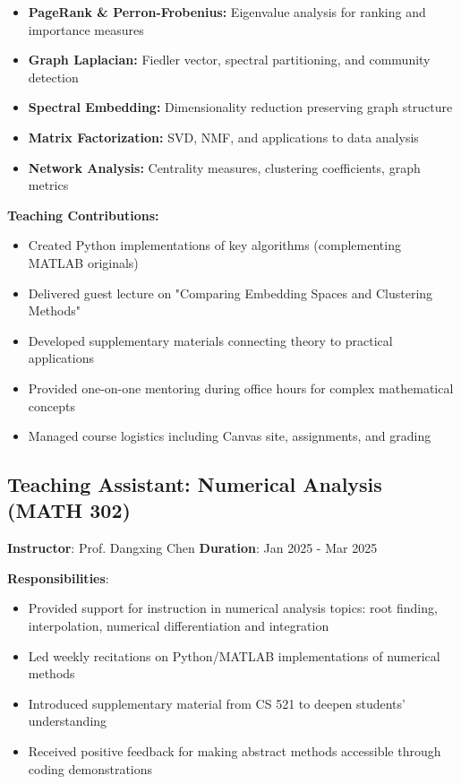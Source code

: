 \begin{itemize}[leftmargin=1.2em, itemsep=0.1em]
  \item \textbf{PageRank \& Perron-Frobenius:} Eigenvalue analysis for ranking and importance measures
  \item \textbf{Graph Laplacian:} Fiedler vector, spectral partitioning, and community detection
  \item \textbf{Spectral Embedding:} Dimensionality reduction preserving graph structure
  \item \textbf{Matrix Factorization:} SVD, NMF, and applications to data analysis
  \item \textbf{Network Analysis:} Centrality measures, clustering coefficients, graph metrics
\end{itemize}

\textbf{Teaching Contributions:}

\begin{itemize}[leftmargin=1.2em, itemsep=0.1em]
  \item Created Python implementations of key algorithms (complementing MATLAB originals)
  \item Delivered guest lecture on "Comparing Embedding Spaces and Clustering Methods"
  \item Developed supplementary materials connecting theory to practical applications
  \item Provided one-on-one mentoring during office hours for complex mathematical concepts
  \item Managed course logistics including Canvas site, assignments, and grading
\end{itemize}

\vspace{1em}


\subsection*{Teaching Assistant: Numerical Analysis (MATH 302)}

\textbf{Instructor}: Prof. Dangxing Chen \quad \textbf{Duration}: Jan 2025 - Mar 2025

\textbf{Responsibilities}:
\begin{itemize}[leftmargin=1.2em, itemsep=0.1em]
  \item Provided support for instruction in numerical analysis topics: root finding, interpolation, numerical differentiation and integration
  \item Led weekly recitations on Python/MATLAB implementations of numerical methods
  \item Introduced supplementary material from CS 521 to deepen students' understanding
  \item Received positive feedback for making abstract methods accessible through coding demonstrations
\end{itemize}

